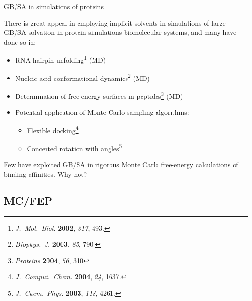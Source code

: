 \documentclass[10pt]{beamer}
\begin{document}
\begin{frame}[t]{GB/SA in simulations of proteins}

There is great appeal in employing implicit solvents in simulations of large
GB/SA solvation in protein simulations biomolecular systems, and many have done so in:

\begin{itemize}
    \item RNA hairpin unfolding\footnote{\textit{J.\ Mol.\ Biol.} \textbf{2002}, \textit{317}, 493.} (MD)
    \item Nucleic acid conformational dynamics\footnote{\textit{Biophys.\ J.} \textbf{2003}, \textit{85}, 790.} (MD)
    \item Determination of free-energy surfaces in peptides\footnote{\textit{Proteins} \textbf{2004}, \textit{56}, 310} (MD)
    \item Potential application of Monte Carlo sampling algorithms:
    \begin{itemize}
    \item Flexible docking\footnote{\textit{J.\ Comput.\ Chem.} \textbf{2004}, \textit{24}, 1637.}
    \item Concerted rotation with angles\footnote{\textit{J.\ Chem.\ Phys.} \textbf{2003}, \textit{118}, 4261.}
    \end{itemize}
\end{itemize}

Few have exploited GB/SA in rigorous Monte Carlo free-energy calculations
of binding affinities. Why not?


\end{frame}


\subsection{MC/FEP}

\end{document}
